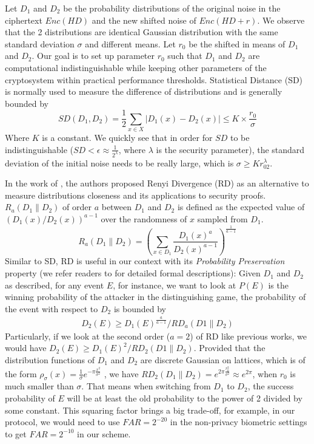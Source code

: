 Let $D_1$ and $D_2$ be the probability distributions of the original noise in
the ciphertext $Enc(HD)$ and the new shifted noise of $Enc(HD+r)$. We observe
that the 2 distributions are identical Gaussian distribution with the same
standard deviation $\sigma$ and different means. Let $r_0$ be the shifted in
means of $D_1$ and $D_2$.  Our goal is to set up parameter $r_0$ such that $D_1$
and $D_2$ are computational indistinguishable while keeping other parameters of
the cryptosystem within practical performance thresholds. Statistical Distance
(SD) is normally used to measure the difference of distributions and is
generally bounded by
\[
SD(D_1, D_2) = \frac{1}{2}\sum_{x\in X}|D_1(x) - D_2(x)| \leq K\times \frac{r_0}
{\sigma}
\]
Where $K$ is a constant. We quickly see that in order for $SD$ to be
indistinguishable ($SD < \epsilon \approx \frac{1}{2^\lambda}$, where $\lambda$
is the security parameter), the standard deviation of the initial noise needs to
be really large, which is $\sigma \geq Kr_02^\lambda$.

In the work of \cite{bai2015improved}, the authors proposed Renyi Divergence
(RD) as an alternative to measure distributions closeness and its applications
to security proofs. $R_a(D_1\|D_2)$ of order $a$ between $D_1$ and $D_2$ is
defined as the expected value of $(D_1(x)/D_2(x))^{a-1}$ over the randomness of
$x$ sampled from $D_1$.
\[
R_a(D_1\|D_2) = \left( \sum_{x \in D_1}\frac{D_1(x)^a}{D_2(x)^{a-1}} \right)^
{\frac{1}{a-1}}
\]
Similar to SD, RD is useful in our context with its \textit{Probability
  Preservation} property (we refer readers to \cite{bai2015improved} for
detailed formal descriptions): Given $D_1$ and $D_2$ as described, for any event
$E$, for instance, we want to look at $P(E)$ is the winning probability of the
attacker in the distinguishing game, the probability of the event with respect
to $D_2$ is bounded by
\begin{align}
\label{eq:renyi}
D_2(E) \geq D_1(E)^{\frac{a}{a-1}}/RD_a(D1\|D_2)
\end{align}
Particularly, if we look at the second order ($a = 2$) of RD like previous
works, we would have $ D_2(E) \geq D_1(E)^2/RD_2(D1\|D_2) $.  Provided that the
distribution functions of $D_1$ and $D_2$ are discrete Gaussian on lattices,
which is of the form
$\rho_\sigma(x) = \frac{1}{\sigma}e^{-\pi\frac{x^2} {\sigma^2}}$ , we have
$RD_2(D_1\|D_2) = e^{2\pi \frac{r_0^2}{\sigma^2}} \approx e^{2\pi}$, when $r_0$
is much smaller than $\sigma$. That means when switching from $D_1$ to $D_2$,
the success probability of $E$ will be at least the old probability to the power
of 2 divided by some constant. This squaring factor brings a big trade-off, for
example, in our protocol, we would need to use $FAR = 2^{-20}$ in the
non-privacy biometric settings to get $FAR=2^{-10}$ in our scheme.

